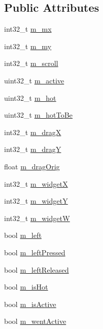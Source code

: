 \subsection*{Public Attributes}
\begin{DoxyCompactItemize}
\item 
int32\+\_\+t \hyperlink{struct_imgui_a28eeab8c2fdd36902be42935ca1b068f}{m\+\_\+mx}
\item 
int32\+\_\+t \hyperlink{struct_imgui_a54acd29561c96474b53bd8c3aa26d1c8}{m\+\_\+my}
\item 
int32\+\_\+t \hyperlink{struct_imgui_ace74bbf1a80fc8155680b2c7cc215866}{m\+\_\+scroll}
\item 
uint32\+\_\+t \hyperlink{struct_imgui_a5aa45e2447725b5ca76b14e5412c7cf5}{m\+\_\+active}
\item 
uint32\+\_\+t \hyperlink{struct_imgui_a63ac173d88de09657f1deba0418d8b93}{m\+\_\+hot}
\item 
uint32\+\_\+t \hyperlink{struct_imgui_a2b1f111fa4db6fd3a50d3e5c171e045d}{m\+\_\+hot\+To\+Be}
\item 
int32\+\_\+t \hyperlink{struct_imgui_aefd00be44d7c6a969eff513f2ffb4552}{m\+\_\+drag\+X}
\item 
int32\+\_\+t \hyperlink{struct_imgui_a871d49118493dfed45309a8104a396f8}{m\+\_\+drag\+Y}
\item 
float \hyperlink{struct_imgui_ad4f0591e5e4bdb67821f66c66b7d9902}{m\+\_\+drag\+Orig}
\item 
int32\+\_\+t \hyperlink{struct_imgui_aa21d6fd70766cb804e86ddb341c1b689}{m\+\_\+widget\+X}
\item 
int32\+\_\+t \hyperlink{struct_imgui_a042e283b16ddcc06e5d8070885aa8bd6}{m\+\_\+widget\+Y}
\item 
int32\+\_\+t \hyperlink{struct_imgui_a09be3810b97464e9ec9d4d8883d1aca3}{m\+\_\+widget\+W}
\item 
bool \hyperlink{struct_imgui_af1c5e003ba01ccb02880f330c5f0eb9a}{m\+\_\+left}
\item 
bool \hyperlink{struct_imgui_ae92c0cc43267ec19debdd74742b3bf77}{m\+\_\+left\+Pressed}
\item 
bool \hyperlink{struct_imgui_a18c28b5938d175e28384fea64bf81d6e}{m\+\_\+left\+Released}
\item 
bool \hyperlink{struct_imgui_ad7bfdedfc25d70896a74b417113514b8}{m\+\_\+is\+Hot}
\item 
bool \hyperlink{struct_imgui_a6eaf1b0dc223c0f6c8281aec73533ed3}{m\+\_\+is\+Active}
\item 
bool \hyperlink{struct_imgui_a65c4171e4ded77458c189fd935b1fe36}{m\+\_\+went\+Active}

\end{DoxyCompactItemize}
